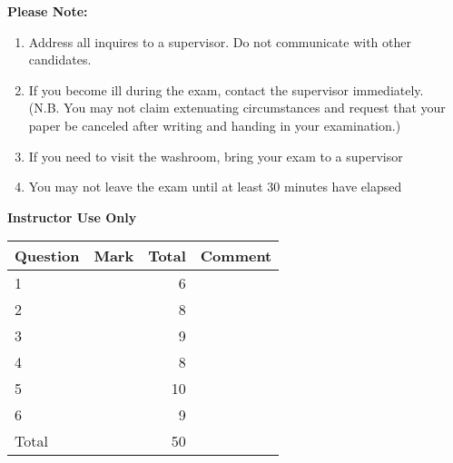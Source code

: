 \documentclass[12pt,legalpaper]{exam}
\begin{document}
\hrulefill
\vspace{1cm}
{\large\bfseries\sffamily Please Note:}
\begin{enumerate}
    \item Address all inquires to a supervisor. Do not communicate with other candidates.
    \item If you become ill during the exam, contact the supervisor immediately. \\
    (N.B. You may not claim extenuating circumstances and request that your paper be canceled after writing and
    handing in your examination.)
    \item If you need to visit the washroom, bring your exam to a supervisor
    \item You may not leave the exam until at least 30 minutes have elapsed
\end{enumerate}
\begin{center}
    {\bf Instructor Use Only}\\
    \vspace{.5cm}
    \begin{tabular}{|l|l|r|l|}
        \hline
        Question & Mark & Total & Comment\\
        \hline
        1 & & 6  & \\ \hline
        2 & & 8  & \\ \hline
        3 & & 9  & \\ \hline
        4 & & 8  & \\ \hline
        5 & & 10 & \\ \hline
        6 & & 9  & \\ \hline
        \hline
        Total & & 50 &\\
        \hline
    \end{tabular}
\end{center}

\begin{questions}
\end{questions}
\end{document}

